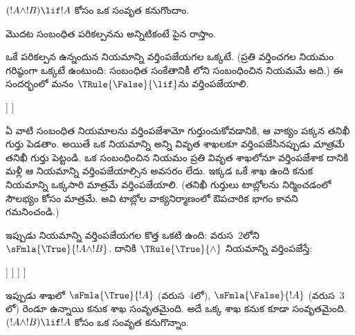 \documentclass[../../../include/open-logic-section]{subfiles}
\begin{document}
      {}
      {}


\begin{ex}
 $(!A \land !B) \lif !A$ కోసం ఒక సంవృత 
కనుగొందాం.

మొదట సంబంధిత పరికల్పనను  అన్నిటికంటే పైన రాస్తాం.
\begin{oltableau}
  [\sFmla{\False}{(\formula{A} \land \formula{B}) \lif \formula{A}},
    just = \TAss]
\end{oltableau}

ఒకే పరికల్పన ఉన్నందున నియమాన్ని వర్తింపజేయగల 
ఒక్కటే. (ప్రతి  వర్తించగల నియమం గరిష్ఠంగా
ఒక్కటే ఉంటుంది: సంబంధిత సంకేతానికీ లోని
 సంబంధించిన నియమమే అది.) ఈ సందర్భంలో మనం
$\TRule{\False}{\lif}$ను వర్తింపజేయాలి.
\begin{oltableau}
  [\sFmla{\False}{(\formula{A} \land \formula{B}) \lif \formula{A}},
    checked, just = \TAss
    [\sFmla{\True}{\formula{A} \land \formula{B}},
      just={\TRule{\False}{\lif}[1]}
      [\sFmla{\False}{\formula{A}}, just={\TRule{\False}{\lif}[1]}]
    ]
  ]
\end{oltableau}
ఏ  వాటి సంబంధిత నియమాలను వర్తింపజేశామో
గుర్తుంచుకోవడానికి, ఆ వాక్యం పక్కన తనిఖీ గుర్తు పెడతాం. అయితే ఒక
నియమాన్ని అన్ని వివృత శాఖలకూ వర్తింపజేసినప్పుడు \emph{మాత్రమే}
తనిఖీ గుర్తు పెట్టండి. ఒక  సంబంధించిన నియమం
ప్రతి వివృత శాఖలోనూ వర్తింపజేశాక దానికి మళ్లీ
ఆ నియమాన్ని వర్తింపజేయాల్సిన అవసరం లేదు. ఇక్కడ ఒకే శాఖ ఉంది కనుక
నియమాన్ని ఒక్కసారి మాత్రమే వర్తింపజేయాలి. (తనిఖీ గుర్తులు టాబ్లోలను
నిర్మించడంలో సౌలభ్యం కోసం మాత్రమే. అవి టాబ్లోల వాక్యనిర్మాణంలో
ఔపచారిక భాగం కావని గమనించండి.)

ఇప్పుడు నియమాన్ని వర్తింపజేయగల కొత్త  ఒకటి ఉంది:
వరుస~$2$లోని $\sFmla{\True}{!A \land !B}$. దానికి
$\TRule{\True}{\land}$ నియమాన్ని వర్తింపజేస్తే:
\begin{oltableau}
  [\sFmla{\False}{(\formula{A} \land \formula{B}) \lif \formula{A}},
    checked, just = \TAss
    [\sFmla{\True}{\formula{A} \land \formula{B}},
      just={\TRule{\False}{\lif}[1]}, checked
      [\sFmla{\False}{\formula{A}}, just={\TRule{\False}{\lif}[1]}
        [\sFmla{\True}{\formula{A}}, just={\TRule{\True}{\land}[2]}
          [\sFmla{\True}{\formula{B}}, just={\TRule{\True}{\land}[2]}, close
          ]
        ]
      ]
    ]
  ]
\end{oltableau}
ఇప్పుడు శాఖలో $\sFmla{\True}{!A}$ (వరుస~$4$లో),
$\sFmla{\False}{!A}$ (వరుస~$3$లో) రెండూ ఉన్నాయి కనుక శాఖ
సంవృతమైంది. అదే ఒక్క శాఖ కనుక  కూడా సంవృతమైంది.
$(!A \land !B) \lif !A$ కోసం ఒక సంవృత  కనుగొన్నాం.
\end{ex}
\end{document}
